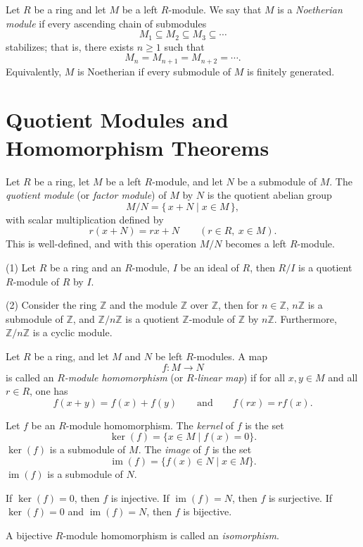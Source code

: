 \documentclass[11pt, a4paper]{report}
\begin{document}
\begin{definition}
    Let $R$ be a ring and let $M$ be a left $R$-module. We say that $M$ is a \emph{Noetherian module} if every ascending chain of submodules
    \[
    M_1 \subseteq M_2 \subseteq M_3 \subseteq \cdots
    \]
    stabilizes; that is, there exists $n \ge 1$ such that
    \[
    M_n = M_{n+1} = M_{n+2} = \cdots.
    \]
    Equivalently, $M$ is Noetherian if every submodule of $M$ is finitely generated.
\end{definition}



\section{Quotient Modules and Homomorphism Theorems}

\begin{definition}
    Let $R$ be a ring, let $M$ be a left $R$-module, and let $N$ be a submodule of $M$. The \emph{quotient module} (or \emph{factor module}) of $M$ by $N$ is the quotient abelian group
    \[
    M/N=\{\,x+N \mid x\in M\,\},
    \]
    with scalar multiplication defined by
    \[
    r(x+N)=rx+N
    \qquad
    (r\in R,\ x\in M).
    \]
    This is well-defined, and with this operation $M/N$ becomes a left $R$-module.
\end{definition}

\begin{example} 
(1) Let $ R $ be a ring and an $ R $-module, $ I $ be an ideal of $ R $, then $ R/I $ is a quotient $ R $-module of $ R $ by $ I $.

(2) Consider the ring $ \mathbb{Z} $ and the module $ \mathbb{Z} $ over $ \mathbb{Z} $, then for $ n \in \mathbb{Z} $, $ n \mathbb{Z} $ is a submodule of $ \mathbb{Z} $, and $ \mathbb{Z}/n\mathbb{Z} $ is a quotient $ \mathbb{Z} $-module of $ \mathbb{Z} $ by $ n\mathbb{Z} $. Furthermore, $ \mathbb{Z}/n\mathbb{Z} $ is a cyclic module.
\end{example}

\begin{definition}
    Let $R$ be a ring, and let $M$ and $N$ be left $R$-modules. A map
    \[
    f:M\to N
    \]
    is called an \emph{$R$-module homomorphism} (or \emph{$R$-linear map}) if for all $x,y\in M$ and all $r\in R$, one has
    \[
    f(x+y)=f(x)+f(y)
    \qquad\text{and}\qquad
    f(rx)=rf(x).
    \]
\end{definition}

\begin{definition} 
Let $ f $ be an $ R $-module homomorphism. The \emph{kernel} of $ f $ is the set
\[
\ker(f) = \{ x \in M \mid f(x) = 0 \}.
\]
$ \ker(f) $ is a submodule of $ M $.
The \emph{image} of $ f $ is the set
\[
\operatorname{im}(f) = \{ f(x) \in N \mid x \in M \}.
\]
$ \operatorname{im}(f) $ is a submodule of $ N $.

If $ \ker(f) = 0 $, then $ f $ is injective.
If $ \operatorname{im}(f) = N $, then $ f $ is surjective.
If $ \ker(f) = 0 $ and $ \operatorname{im}(f) = N $, then $ f $ is bijective.

A bijective $ R $-module homomorphism is called an \emph{isomorphism}.
\end{definition}
\end{document}
